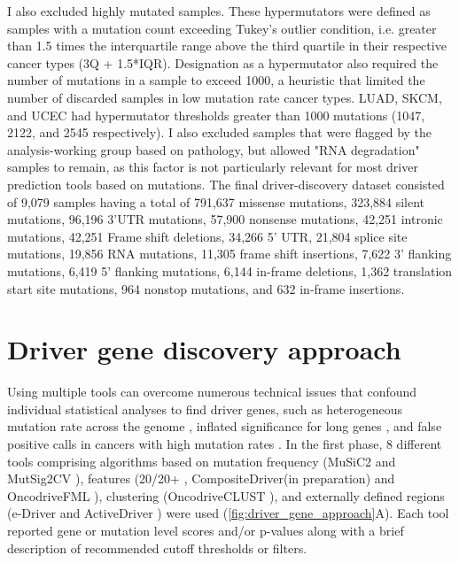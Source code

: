 I also excluded highly mutated samples. These hypermutators were defined as samples with a mutation count exceeding Tukey's outlier condition, i.e. greater than 1.5 times the interquartile range above the third quartile in their respective cancer types (3Q + 1.5*IQR). Designation as a hypermutator also required the number of mutations in a sample to exceed 1000, a heuristic that limited the number of discarded samples in low mutation rate cancer types. LUAD, SKCM, and UCEC had hypermutator thresholds greater than 1000 mutations (1047, 2122, and 2545 respectively). I also excluded samples that were flagged by the analysis-working group based on pathology, but allowed "RNA degradation" samples to remain, as this factor is not particularly relevant for most driver prediction tools based on mutations. The final driver-discovery dataset consisted of 9,079 samples having a total of 791,637 missense mutations, 323,884 silent mutations, 96,196 3'UTR mutations, 57,900 nonsense mutations, 42,251 intronic mutations, 42,251 Frame shift deletions, 34,266 5' UTR, 21,804 splice site mutations, 19,856 RNA mutations, 11,305 frame shift insertions, 7,622 3' flanking mutations, 6,419 5' flanking mutations, 6,144 in-frame deletions, 1,362 translation start site mutations, 964 nonstop mutations, and 632 in-frame insertions.

\section{Driver gene discovery approach}
Using multiple tools can overcome numerous technical issues that confound individual statistical analyses to find driver genes, such as heterogeneous mutation rate across the genome \cite{RN13}, inflated significance for long genes \cite{RN169}, and false positive calls in cancers with high mutation rates \cite{RN70}. In the first phase, 8 different tools comprising algorithms based on mutation frequency (MuSiC2 \cite{RN43} and MutSig2CV \cite{RN14}), features (20/20+ \cite{RN70}, CompositeDriver(in preparation) and OncodriveFML \cite{RN86}), clustering (OncodriveCLUST \cite{RN54}), and externally defined regions (e-Driver \cite{RN153} and ActiveDriver \cite{RN98}) were used (\autoref{fig:driver_gene_approach}A). Each tool reported gene or mutation level scores and/or p-values along with a brief description of recommended cutoff thresholds or filters.

